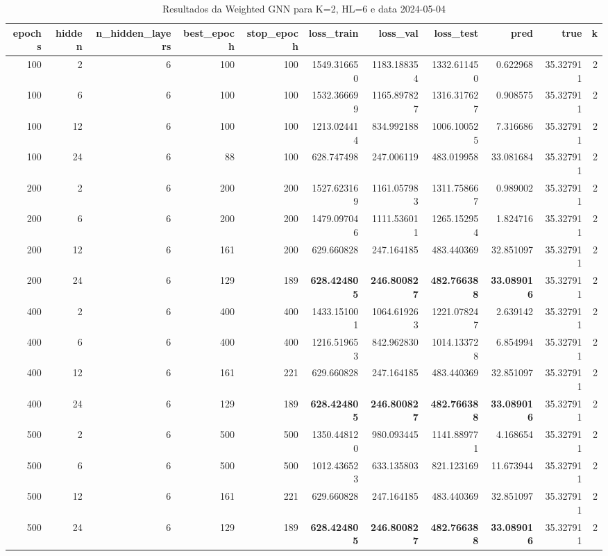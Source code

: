 \begin{table}
\caption{Resultados da Weighted GNN para K=2, HL=6 e data 2024-05-04}
\label{tab:weighted_gnn_results_k2_hl6_d20240504}
\begin{tabular}{rrrrrrrrrrr}
\toprule
epochs & hidden & n\_hidden\_layers & best\_epoch & stop\_epoch & loss\_train & loss\_val & loss\_test & pred & true & k \\
\midrule
100 & 2 & 6 & 100 & 100 & 1549.316650 & 1183.188354 & 1332.611450 & 0.622968 & 35.327911 & 2 \\
100 & 6 & 6 & 100 & 100 & 1532.366699 & 1165.897827 & 1316.317627 & 0.908575 & 35.327911 & 2 \\
100 & 12 & 6 & 100 & 100 & 1213.024414 & 834.992188 & 1006.100525 & 7.316686 & 35.327911 & 2 \\
100 & 24 & 6 & 88 & 100 & 628.747498 & 247.006119 & 483.019958 & 33.081684 & 35.327911 & 2 \\
200 & 2 & 6 & 200 & 200 & 1527.623169 & 1161.057983 & 1311.758667 & 0.989002 & 35.327911 & 2 \\
200 & 6 & 6 & 200 & 200 & 1479.097046 & 1111.536011 & 1265.152954 & 1.824716 & 35.327911 & 2 \\
200 & 12 & 6 & 161 & 200 & 629.660828 & 247.164185 & 483.440369 & 32.851097 & 35.327911 & 2 \\
200 & 24 & 6 & 129 & 189 & \textbf{628.424805} & \textbf{246.800827} & \textbf{482.766388} & \textbf{33.089016} & 35.327911 & 2 \\
400 & 2 & 6 & 400 & 400 & 1433.151001 & 1064.619263 & 1221.078247 & 2.639142 & 35.327911 & 2 \\
400 & 6 & 6 & 400 & 400 & 1216.519653 & 842.962830 & 1014.133728 & 6.854994 & 35.327911 & 2 \\
400 & 12 & 6 & 161 & 221 & 629.660828 & 247.164185 & 483.440369 & 32.851097 & 35.327911 & 2 \\
400 & 24 & 6 & 129 & 189 & \textbf{628.424805} & \textbf{246.800827} & \textbf{482.766388} & \textbf{33.089016} & 35.327911 & 2 \\
500 & 2 & 6 & 500 & 500 & 1350.448120 & 980.093445 & 1141.889771 & 4.168654 & 35.327911 & 2 \\
500 & 6 & 6 & 500 & 500 & 1012.436523 & 633.135803 & 821.123169 & 11.673944 & 35.327911 & 2 \\
500 & 12 & 6 & 161 & 221 & 629.660828 & 247.164185 & 483.440369 & 32.851097 & 35.327911 & 2 \\
500 & 24 & 6 & 129 & 189 & \textbf{628.424805} & \textbf{246.800827} & \textbf{482.766388} & \textbf{33.089016} & 35.327911 & 2 \\

\end{tabular}
\end{table}
